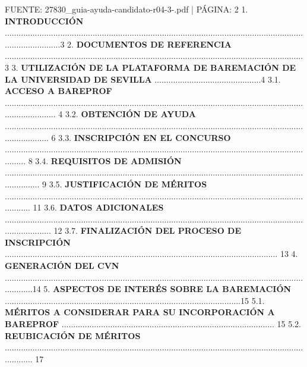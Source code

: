 \documentclass{article}
\begin{document}
\begin{itemize}
\begin{itemize}
\begin{scriptsize}
                  FUENTE: 27830\_guia-ayuda-candidato-r04-3-.pdf | PÁGINA: 2
                  1. \textbf{INTRODUCCIÓN} .........................................................................................................................................................3
                  2. \textbf{DOCUMENTOS DE REFERENCIA} .................................................................................................................................3
                  3. \textbf{UTILIZACIÓN DE LA PLATAFORMA DE BAREMACIÓN DE LA UNIVERSIDAD DE SEVILLA} ..............................................4
                  3.1. \textbf{ACCESO A BAREPROF} ....................................................................................................................................................... 4
                  3.2. \textbf{OBTENCIÓN DE AYUDA} .................................................................................................................................................... 6
                  3.3. \textbf{INSCRIPCIÓN EN EL CONCURSO} .......................................................................................................................................... 8
                  3.4. \textbf{REQUISITOS DE ADMISIÓN} ................................................................................................................................................ 9
                  3.5. \textbf{JUSTIFICACIÓN DE MÉRITOS} ............................................................................................................................................ 11
                  3.6. \textbf{DATOS ADICIONALES} ..................................................................................................................................................... 12
                  3.7. \textbf{FINALIZACIÓN DEL PROCESO DE INSCRIPCIÓN} ...................................................................................................................... 13
                  4. \textbf{GENERACIÓN DEL CVN} .............................................................................................................................................14
                  5. \textbf{ASPECTOS DE INTERÉS SOBRE LA BAREMACIÓN} ......................................................................................................15
                  5.1. \textbf{MÉRITOS A CONSIDERAR PARA SU INCORPORACIÓN A BAREPROF} ............................................................................................ 15
                  5.2. \textbf{REUBICACIÓN DE MÉRITOS} ............................................................................................................................................. 17

\end{scriptsize}
\end{itemize}
\end{itemize}
\end{document}
